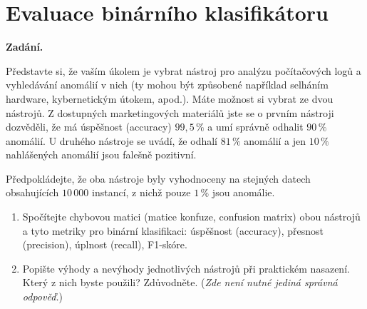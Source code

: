 \section{Evaluace binárního klasifikátoru}

\noindent\textbf{Zadání.}\par
Představte si, že vaším úkolem je vybrat nástroj pro analýzu počítačových logů a vyhledávání anomálií
v nich (ty mohou být způsobené například selháním hardware, kybernetickým útokem, apod.). Máte možnost
si vybrat ze dvou nástrojů. Z dostupných marketingových materiálů jste se o prvním nástroji dozvěděli,
že má úspěšnost (accuracy) $99{,}5\,\%$ a umí správně odhalit $90\,\%$ anomálií. U druhého nástroje se uvádí,
že odhalí $81\,\%$ anomálií a jen $10\,\%$ nahlášených anomálií jsou falešně pozitivní.

\medskip
Předpokládejte, že oba nástroje byly vyhodnoceny na stejných datech obsahujících $10\,000$ instancí,
z nichž pouze $1\,\%$ jsou anomálie.

\begin{enumerate}
  \item Spočítejte chybovou matici (matice konfuze, confusion matrix) obou nástrojů a tyto metriky pro
    binární klasifikaci: úspěšnost (accuracy), přesnost (precision), úplnost (recall), F1-skóre.
  \item Popište výhody a nevýhody jednotlivých nástrojů při praktickém nasazení. Který z nich byste
    použili? Zdůvodněte. (\textit{Zde není nutné jediná správná odpověď.})
\end{enumerate}

